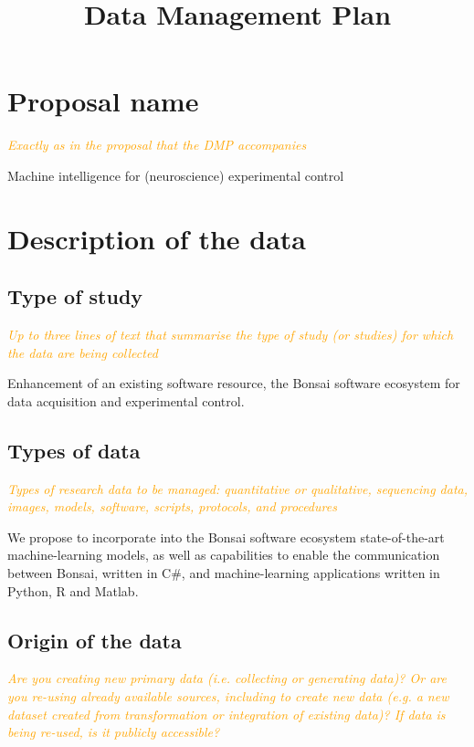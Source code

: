 \documentclass[a4paper,11pt]{article}
\title{Data Management Plan}
\author{}
\date{}
\begin{document}
\maketitle

\setcounter{section}{-1}

\section{Proposal name}

\textcolor{orange}{\textit{Exactly as in the proposal that the DMP accompanies}}

Machine intelligence for (neuroscience) experimental control

\section{Description of the data}
\subsection{Type of study}

\textcolor{orange}{\textit{Up to three lines of text that summarise the type of study (or studies) for which the data are being collected}}

Enhancement of an existing software resource, the Bonsai software
ecosystem for data acquisition and experimental control.

\subsection{Types of data}

\textcolor{orange}{\textit{Types of research data to be managed: quantitative or
qualitative, sequencing data, images, models, software, scripts, protocols, and
procedures}}

We propose to incorporate into the Bonsai software ecosystem state-of-the-art
machine-learning models, as well as capabilities to enable the communication
between Bonsai, written in C\#, and machine-learning applications written in
Python, R and Matlab.

\subsection{Origin of the data}

\textcolor{orange}{\textit{Are you creating new primary data (i.e. collecting or
generating data)? Or are you re-using already available sources, including to
create new data (e.g. a new dataset created from transformation or integration
of existing data)? If data is being re-used, is it publicly accessible?}}
\end{document}
